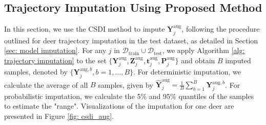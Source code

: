 \documentclass[11pt]{article}
\begin{document}
\subsection{Trajectory Imputation Using Proposed Method}
In this section, we use the CSDI method to impute $\bm{Y}_j^{\mathrm{aug}}$, following the procedure outlined for deer trajectory imputation in the test dataset, as detailed in Section \ref{sec: model imputation}. For any $j$ in $\mathcal{D}_{\mathrm{train}} \cup \mathcal{D}_{\mathrm{test}}$, we apply Algorithm \ref{alg: trajectory imputation} to the set $\{\bm{Y}_j^{\mathrm{aug}}, \bm{Z}_j^{\mathrm{aug}}, \bm{t}_j^{\mathrm{aug}}, \bm{P}_j^{\mathrm{aug}}\}$ and obtain $B$ imputed samples, denoted by $\{\bm{Y}_j^{\mathrm{aug},b}, b=1,\ldots, B\}$. For deterministic imputation, we calculate the average of all $B$ samples, given by $\hat{\bm{Y}}_j^{\mathrm{aug}} = \frac{1}{B} \sum_{b=1}^B \bm{Y}_j^{\mathrm{aug},b}$. For probabilistic imputation, we calculate the 5\% and 95\% quantiles of the samples to estimate the "range". Visualizations of the imputation for one deer are presented in Figure \ref{fig: csdi_aug}.
\end{document}
